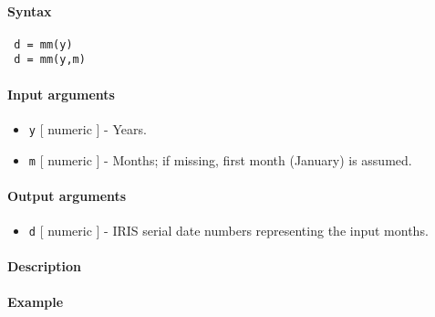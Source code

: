 


	\paragraph{Syntax}
 
 \begin{verbatim}
 d = mm(y)
 d = mm(y,m)
 \end{verbatim}
 
 \paragraph{Input arguments}
 
 \begin{itemize}
 \item
   \texttt{y} {[} numeric {]} - Years.
 \item
   \texttt{m} {[} numeric {]} - Months; if missing, first month (January)
   is assumed.
 \end{itemize}
 
 \paragraph{Output arguments}
 
 \begin{itemize}
 \item
   \texttt{d} {[} numeric {]} - IRIS serial date numbers representing the
   input months.
 \end{itemize}
 
 \paragraph{Description}
 
 \paragraph{Example}



